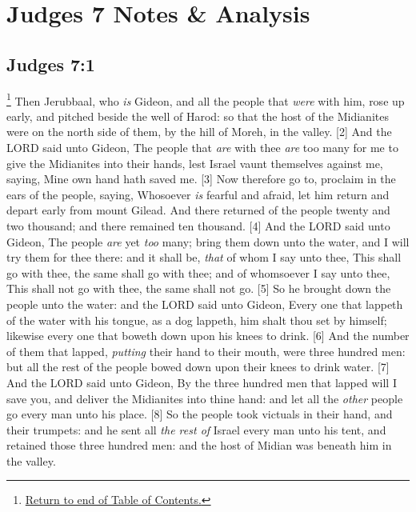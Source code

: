 \chapter{Judges 7 Notes \& Analysis}
\section{Judges 7:1}
\footnote{\textcolor[rgb]{0.00,0.25,0.00}{\hyperlink{JudgesTOC}{Return to end of Table of Contents.}}}
\textcolor[rgb]{0.00,0.00,1.00}{Then Jerubbaal, who \emph{is} Gideon, and all the people that \emph{were} with him, rose up early, and pitched beside the well of Harod: so that the host of the Midianites were on the north side of them, by the hill of Moreh, in the valley.}
[2] \textcolor[rgb]{0.00,0.00,1.00}{And the LORD said unto Gideon, The people that \emph{are} with thee \emph{are} too many for me to give the Midianites into their hands, lest Israel vaunt themselves against me, saying, Mine own hand hath saved me.}
[3] \textcolor[rgb]{0.00,0.00,1.00}{Now therefore go to, proclaim in the ears of the people, saying, Whosoever \emph{is} fearful and afraid, let him return and depart early from mount Gilead. And there returned of the people twenty and two thousand; and there remained ten thousand.}
[4] \textcolor[rgb]{0.00,0.00,1.00}{And the LORD said unto Gideon, The people \emph{are} yet \emph{too} many; bring them down unto the water, and I will try them for thee there: and it shall be, \emph{that} of whom I say unto thee, This shall go with thee, the same shall go with thee; and of whomsoever I say unto thee, This shall not go with thee, the same shall not go.}
[5] \textcolor[rgb]{0.00,0.00,1.00}{So he brought down the people unto the water: and the LORD said unto Gideon, Every one that lappeth of the water with his tongue, as a dog lappeth, him shalt thou set by himself; likewise every one that boweth down upon his knees to drink.}
[6] \textcolor[rgb]{0.00,0.00,1.00}{And the number of them that lapped, \emph{putting} their hand to their mouth, were three hundred men: but all the rest of the people bowed down upon their knees to drink water.}
[7] \textcolor[rgb]{0.00,0.00,1.00}{And the LORD said unto Gideon, By the three hundred men that lapped will I save you, and deliver the Midianites into thine hand: and let all the \emph{other} people go every man unto his place.}
[8] \textcolor[rgb]{0.00,0.00,1.00}{So the people took victuals in their hand, and their trumpets: and he sent all \emph{the rest of} Israel every man unto his tent, and retained those three hundred men: and the host of Midian was beneath him in the valley.}\\
